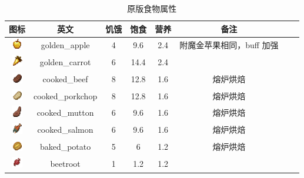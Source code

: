 \begin{center}
    \setlength{\tabcolsep}{4mm}
    \begin{longtable}{c|c|ccc|ccc}
        \caption{原版食物属性} \\
        \toprule
        \textbf{图标} & \textbf{英文} & \textbf{饥饿} & \textbf{饱食} & \textbf{营养} & \textbf{备注} \\
        \midrule
        \includegraphics[width=0.5cm,height=0.5cm]{./images/origin/golden_apple.png} & golden\_apple & 4 & 9.6 & 2.4 & 附魔金苹果相同，buff 加强 \\
        \includegraphics[width=0.5cm,height=0.5cm]{./images/origin/golden_carrot.png} & golden\_carrot & 6 & 14.4 & 2.4 &  \\
        \midrule
        \includegraphics[width=0.5cm,height=0.5cm]{./images/origin/cooked_beef.png} & cooked\_beef & 8 & 12.8 & 1.6 &  熔炉烘焙 \\
        \includegraphics[width=0.5cm,height=0.5cm]{./images/origin/cooked_porkchop.png} & cooked\_porkchop & 8 & 12.8 & 1.6 & 熔炉烘焙 \\
        \includegraphics[width=0.5cm,height=0.5cm]{./images/origin/cooked_mutton.png} & cooked\_mutton & 6 & 9.6 & 1.6 &  熔炉烘焙 \\
        \includegraphics[width=0.5cm,height=0.5cm]{./images/origin/cooked_salmon.png} & cooked\_salmon & 6 & 9.6 & 1.6 &  熔炉烘焙 \\
        \midrule
        \includegraphics[width=0.5cm,height=0.5cm]{./images/origin/baked_potato.png} & baked\_potato & 5 & 6 & 1.2 & 熔炉烘焙 \\
        \includegraphics[width=0.5cm,height=0.5cm]{./images/origin/beetroot.png} & beetroot & 1 & 1.2 & 1.2 & \\ 

\end{longtable}
\end{center}
